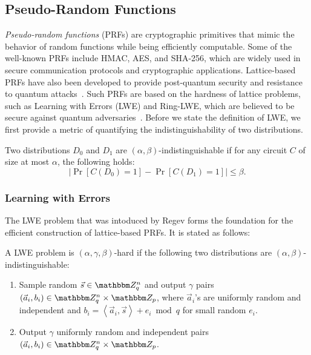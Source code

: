 \subsection{Pseudo-Random Functions}
\emph{Pseudo-random functions} (PRFs) are cryptographic primitives that mimic the behavior of random functions while being efficiently computable.
Some of the well-known PRFs include HMAC, AES, and SHA-256, which are widely used in secure communication protocols and cryptographic applications.
Lattice-based PRFs have also been developed to provide post-quantum security and resistance to quantum attacks~\cite{peikert2014lattice}.
Such PRFs are based on the hardness of lattice problems, such as Learning with Errors (LWE) and Ring-LWE, which are believed to be secure against quantum adversaries~\cite{regev2009lattices, lyubashevsky2013ideal}.
Before we state the definition of LWE, we first provide a metric of quantifying the indistinguishability of two distributions.

\begin{definition}
	Two distributions $D_0$ and $D_1$ are $(\alpha, \beta)$-indistinguishable if for any circuit $C$ of size at most $\alpha$, the following holds:
	\[\left|\Pr[C(D_0) = 1] - \Pr[C(D_1) = 1]\right| \leq \beta.\]	
\end{definition}

\subsubsection{Learning with Errors}
The LWE problem that was intoduced by Regev forms the foundation for the efficient construction of lattice-based PRFs.
It is stated as follows:

\begin{definition}
	A LWE problem is $(\alpha, \gamma, \beta)$-hard if the following two distributions are $(\alpha, \beta)$-indistinguishable:
	\begin{enumerate}
		\item Sample random $\vec{s} \in \Z_q^n$ and output $\gamma$ pairs $\left(\vec{a}_i, b_i\right) \in \Z_q^n \times \Z_p$, where $\vec{a}_i$'s are uniformly random and independent and $b_i = \left\langle \vec{a}_i, \vec{s}\right\rangle + e_i \bmod q$ for small random $e_i$.
		\item Output $\gamma$ uniformly random and independent pairs $\left(\vec{a}_i, b_i\right) \in \Z_q^n \times \Z_p$.
	\end{enumerate}
\end{definition}

